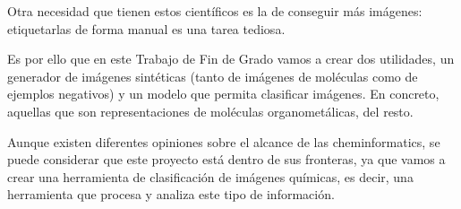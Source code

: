 Otra necesidad que tienen estos científicos es la de conseguir más imágenes: etiquetarlas de forma manual es una tarea tediosa.

Es por ello que en este Trabajo de Fin de Grado vamos a crear dos utilidades, un generador de imágenes sintéticas (tanto de imágenes de moléculas como de ejemplos negativos) y un modelo que permita clasificar imágenes. En concreto, aquellas que son representaciones de moléculas organometálicas, del resto.

Aunque existen diferentes opiniones sobre el alcance de las cheminformatics, se puede considerar que este proyecto está dentro de sus fronteras, ya que vamos a crear una herramienta de clasificación de imágenes químicas, es decir, una herramienta que procesa y analiza este tipo de información.